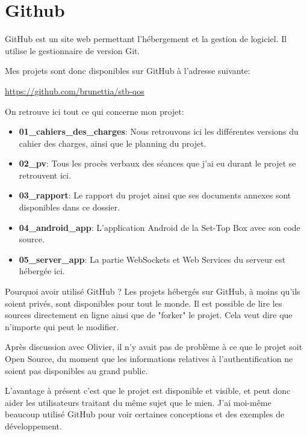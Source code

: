 
\section{Github}
GitHub est un site web permettant l'hébergement et la gestion de logiciel. Il utilise le gestionnaire de version Git.

Mes projets sont donc disponibles sur GitHub à l'adresse suivante:


\smallskip


\url{https://github.com/brunettia/stb-qos}

\medskip

On retrouve ici tout ce qui concerne mon projet:
\smallskip

\begin{itemize}
	\item {\bf 01\_cahiers\_des\_charges}: Nous retrouvons ici les différentes versions du cahier des charges, ainsi que le planning du projet.
	\item {\bf 02\_pv}: Tous les procès verbaux des séances que j'ai eu durant le projet se retrouvent ici.
	\item {\bf 03\_rapport}: Le rapport du projet ainsi que ses documents annexes sont disponibles dans ce dossier.
	\item {\bf 04\_android\_app}: L'application Android de la Set-Top Box avec son code source.
	\item {\bf 05\_server\_app}: La partie WebSockets et Web Services du serveur est hébergée ici.
\end{itemize}

\medskip

Pourquoi avoir utilisé GitHub ? Les projets hébergés sur GitHub, à moins qu'ils soient privés, sont disponibles pour tout le monde. Il est possible de lire les sources directement en ligne ainsi que de "forker" le projet. Cela veut dire que n'importe qui peut le modifier.

\medskip

Après discussion avec Olivier, il n'y avait pas de problème à ce que le projet soit Open Source, du moment que les informations relatives à l'authentification ne soient pas disponibles au grand public.

\medskip

L'avantage à présent c'est que le projet est disponible et visible, et peut donc aider les utilisateurs traitant du même sujet que le mien. J'ai moi-même beaucoup utilisé GitHub pour voir certaines conceptions et des exemples de développement.